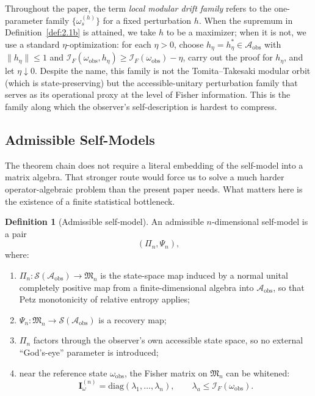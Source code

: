\documentclass[12pt]{article}
\theoremstyle{definition}
\newtheorem{definition}[theorem]{Definition}
\theoremstyle{remark}
\begin{document}
Throughout the paper, the term \emph{local modular drift family}
refers to the one-parameter family \(\{\omega_s^{(h)}\}\) for a fixed
perturbation \(h\). When the supremum in
Definition~\ref{def:2.1b} is attained, we take \(h\) to be a
maximizer; when it is not, we use a standard
\(\eta\)-optimization: for each \(\eta>0\), choose
\(h_\eta=h_\eta^*\in\mathcal{A}_{\mathrm{obs}}\) with
\(\|h_\eta\|\le 1\) and
\(\mathcal{I}_F(\omega_{\mathrm{obs}},h_\eta)\ge
\mathcal{I}_F(\omega_{\mathrm{obs}})-\eta\), carry out the proof for
\(h_\eta\), and let \(\eta\downarrow 0\). Despite the name, this
family is not the Tomita--Takesaki modular orbit (which is
state-preserving) but the accessible-unitary perturbation family that
serves as its operational proxy at the level of Fisher information.
This is the family along which the observer's self-description is
hardest to compress.

\subsection{Admissible Self-Models}\label{subsec:2.2}

The theorem chain does not require a literal embedding of the self-model
into a matrix algebra. That stronger route would force us to solve a
much harder operator-algebraic problem than the present paper needs.
What matters here is the existence of a finite statistical bottleneck.

\begin{definition}[Admissible self-model]\label{def:2.2}
An admissible \(n\)-dimensional self-model is a pair
\[
(\Pi_n,\Psi_n),
\]
where:
\begin{enumerate}
\item \(\Pi_n:\mathcal{S}(\mathcal{A}_{\mathrm{obs}})\to
\mathfrak{M}_n\) is the state-space map induced by a normal unital
completely positive map from a finite-dimensional algebra into
\(\mathcal{A}_{\mathrm{obs}}\), so that Petz monotonicity of relative
entropy applies;
\item \(\Psi_n:\mathfrak{M}_n\to
\mathcal{S}(\mathcal{A}_{\mathrm{obs}})\) is a recovery map;
\item \(\Pi_n\) factors through the observer's own accessible state
space, so no external ``God's-eye'' parameter is introduced;
\item near the reference state \(\omega_{\mathrm{obs}}\), the Fisher
matrix on \(\mathfrak{M}_n\) can be whitened:
\[
\mathbf{I}^{(n)}_\omega
=
\mathrm{diag}(\lambda_1,\dots,\lambda_n),
\qquad
\lambda_a \leq \mathcal{I}_F(\omega_{\mathrm{obs}}).
\]
\end{enumerate}
\end{definition}
\end{document}
